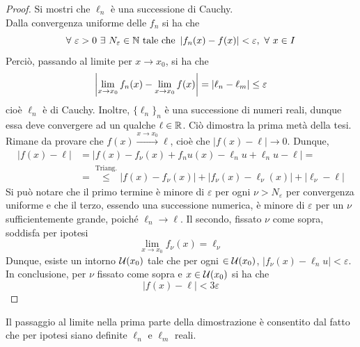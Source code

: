 \begin{proof}
    Si mostri che $\ell_n$ è una successione di Cauchy.\\
    Dalla convergenza uniforme delle $f_n$ si ha che
    \begin{equation}
        \forall\ \varepsilon>0\ \exists\ N_\varepsilon \in \N\ \text{tale che}\ \left| \fn(x)-f(x)\right|< \varepsilon,\ \forall\ x \in I
    \end{equation}
    Perciò, passando al limite per $x \to x_0$, si ha che
    \begin{equation}
        \left| \lim_{x \to x_0}{f_n(x)}-\lim_{x \to x_0}{f(x)}\right| = \left| \ell_n - \ell_m \right| \leq \varepsilon
    \end{equation}
    cioè $\ell_n$ è di Cauchy. Inoltre, $\{\ell_n\}_n$ è una successione di numeri reali, dunque essa deve convergere ad un qualche $\ell \in \mathbb{R}$. Ciò dimostra la prima metà della tesi.\\
    Rimane da provare che $f(x) \overset{x \to x_0}{\to} \ell$, cioè che $|f(x)-\ell| \to 0$. Dunque,
    \begin{equation}
    \begin{aligned}
        \left|f(x)-\ell\right| &= \left| f(x) - f_\nu(x)+ f_nu(x)- \ell_nu+ \ell_nu- \ell\right| =\\
        &=\overset{\text{Triang.}}{\leq} \left| f(x) - f_\nu(x) \right| +\left| f_\nu(x)- \ell_\nu(x)\right|+\left|\ell_\nu-\ell\right|
    \end{aligned}
    \end{equation}
    Si può notare che il primo termine è minore di $\varepsilon$ per ogni $\nu > N_\varepsilon$ per convergenza uniforme e che il terzo, essendo una successione numerica, è minore di $\varepsilon$ per un $\nu$ sufficientemente grande, poiché $\ell_n \to \ell$. Il secondo, fissato $\nu$ come sopra, soddisfa per ipotesi
    \begin{equation}
        \lim_{x \to x_0}{f_\nu(x)} = \ell_\nu
    \end{equation}
    Dunque, esiste un intorno $\mathcal{U}(x_0)$ tale che per ogni $ \in \mathcal{U}(x_0)$, $\left| f_\nu(x)- \ell_nu \right| < \varepsilon$.\\
    In conclusione, per $\nu$ fissato come sopra e $x \in \mathcal{U}(x_0)$ si ha che
    \begin{equation}
        \left|f(x)-\ell\right| < 3 \varepsilon
    \end{equation}
\end{proof}
\begin{oss}
    Il passaggio al limite nella prima parte della dimostrazione è consentito dal fatto che per ipotesi siano definite $\ell_n$ e $\ell_m$ reali.
\end{oss}
